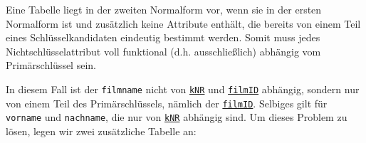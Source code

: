 \begin{tcolorbox}[title=Zweite Normalform]
	Eine Tabelle liegt in der zweiten Normalform vor, wenn sie in der ersten Normalform ist und zusätzlich keine Attribute enthält, die bereits von einem Teil eines Schlüsselkandidaten eindeutig bestimmt werden. Somit muss jedes Nichtschlüsselattribut voll funktional (d.h. ausschließlich) abhängig vom Primärschlüssel sein.
\end{tcolorbox}
In diesem Fall ist der \lstinline!filmname! nicht von \underline{\lstinline!kNR!} und \underline{\lstinline!filmID!} abhängig, sondern nur von einem Teil des Primärschlüssels, nämlich der \underline{\lstinline!filmID!}. Selbiges gilt für \lstinline!vorname! und \lstinline!nachname!, die nur von \underline{\lstinline!kNR!} abhängig sind. Um dieses Problem zu lösen, legen wir zwei zusätzliche Tabelle an:

